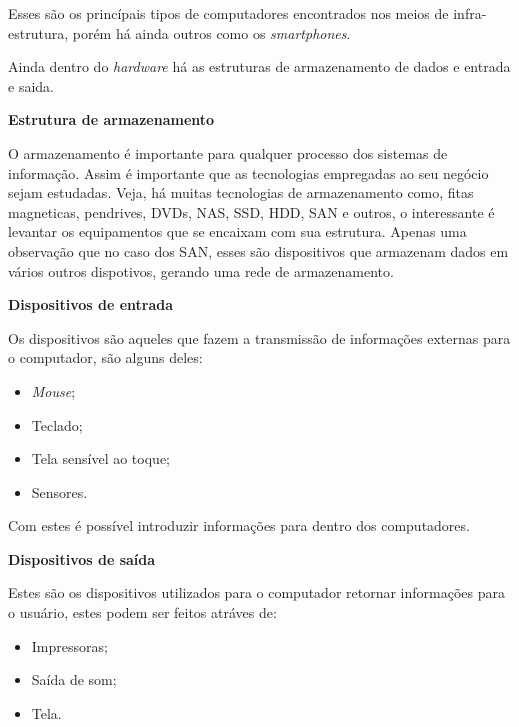\documentclass[
	12pt,				%
	openany,			%
	a4paper,			%
	chapter=TITLE,		%
	section=TITLE,		%
	english,
	brazil				%
]{abntex2}
\begin{document}
\begin{itemize}
\begin{itemize}
\begin{itemize}
	Esses são os princípais tipos de computadores encontrados nos meios de infra-estrutura, porém há ainda outros como os \textit{smartphones}.

	Ainda dentro do \textit{hardware} há as estruturas de armazenamento de dados e entrada e saida.

	\textbf{Estrutura de armazenamento}

	O armazenamento é importante para qualquer processo dos sistemas de informação. Assim é importante que as tecnologias empregadas ao seu negócio sejam estudadas. Veja, há muitas tecnologias de armazenamento como, fitas magneticas, pendrives, DVDs, NAS, SSD, HDD, SAN e outros, o interessante é levantar os equipamentos que se encaixam com sua estrutura.
	Apenas uma observação que no caso dos SAN, esses são dispositivos que armazenam dados em vários outros dispotivos, gerando uma rede de armazenamento.

	\textbf{Dispositivos de entrada}

	Os dispositivos são aqueles que fazem a transmissão de informações externas para o computador, são alguns deles:

	\begin{itemize}
		\item \textit{Mouse};
		\item Teclado;
		\item Tela sensível ao toque;
		\item Sensores.
	\end{itemize}
	Com estes é possível introduzir informações para dentro dos computadores.

	\textbf{Dispositivos de saída}

	Estes são os dispositivos utilizados para o computador retornar informações para o usuário, estes podem ser feitos atráves de:
	\begin{itemize}
		\item Impressoras;
		\item Saída de som;
		\item Tela.
	\end{itemize}


\end{itemize}
\end{itemize}
\end{itemize}
\end{document}
